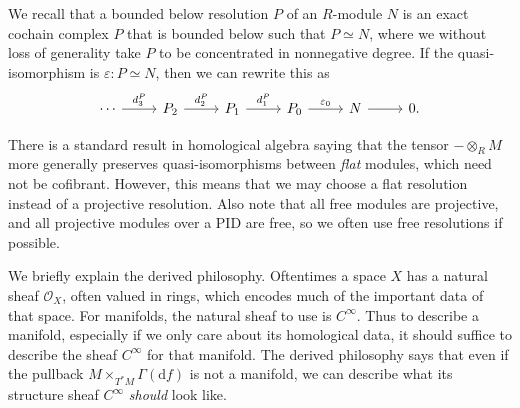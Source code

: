 \begin{construction}
	We recall that a bounded below resolution $P$ of an $R$-module $N$ is an exact cochain complex $P$ that is bounded below such that $P \simeq N$, where we without loss of generality take $P$ to be concentrated in nonnegative degree. If the quasi-isomorphism is $\varepsilon : P \simeq N$, then we can rewrite this as
	\[\begin{tikzcd}[row sep = 2.5em, column sep = 2.5em]
		\cdots \ar[" d_3^P ", r] & P_2 \ar[" d_2^P ", r] & P_1 \ar[" d^P_1 ", r] & P_0 \ar[" \varepsilon _0 ", r] & N \ar[r] & 0.
	\end{tikzcd}\]
	

	There is a standard result in homological algebra saying that the tensor $-\otimes _RM$ more generally preserves quasi-isomorphisms between \emph{flat} modules, which need not be cofibrant. However, this means that we may choose a flat resolution instead of a projective resolution. Also note that all free modules are projective, and all projective modules over a PID are free, so we often use free resolutions if possible.
\end{construction}

\begin{intuition}
	We briefly explain the derived philosophy. Oftentimes a space $X$ has a natural sheaf $\mathcal{O} _X$, often valued in rings, which encodes much of the important data of that space. For manifolds, the natural sheaf to use is $C^\infty $. Thus to describe a manifold, especially if we only care about its homological data, it should suffice to describe the sheaf $C^\infty $ for that manifold. The derived philosophy says that even if the pullback $M\times _{T^*M} \Gamma (\mathrm{d} f)$ is not a manifold, we can describe what its structure sheaf $C^\infty $ \emph{should} look like.
\end{intuition}

